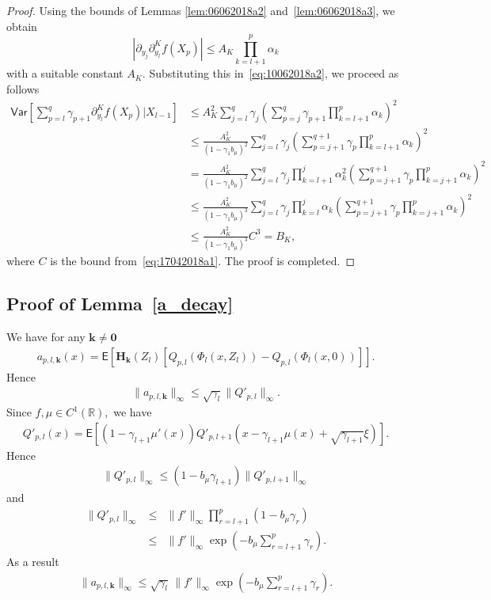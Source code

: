\documentclass[article]{elsarticle}
\begin{document}
\begin{proof}
Using the bounds of
Lemmas \ref{lem:06062018a2} and~\ref{lem:06062018a3},
we obtain
\[
\left|\partial_{y_{j}}\partial_{y_{l}}^{K}f\left(X_{p}\right)\right|
\leq A_{K}\prod_{k=l+1}^{p}\alpha_{k}
\]
with a suitable constant $A_{K}$.
Substituting this in~\eqref{eq:10062018a2},
we proceed as follows
\begin{align*}
\mathsf{Var}\left[\sum_{p=l}^{q}\gamma_{p+1}\partial_{y_{l}}^{K}f\left(X_{p}\right)\Big|X_{l-1}\right]
&\le
A_{K}^{2}\sum_{j=l}^{q}\gamma_{j}
\left(\sum_{p=j}^{q}\gamma_{p+1}\prod_{k=l+1}^{p}\alpha_{k}\right)^{2}
\\
&\le
\frac{A_{K}^{2}}{(1-\gamma_1 b_\mu)^2}
\sum_{j=l}^{q} \gamma_{j}
\left(
\sum_{p=j+1}^{q+1} \gamma_{p} \prod_{k=l+1}^{p} \alpha_{k}
\right)^{2}
\\
&=
\frac{A_{K}^{2}}{(1-\gamma_1 b_\mu)^2}
\sum_{j=l}^{q} \gamma_{j}
\prod_{k=l+1}^{j} \alpha_{k}^2
\left(
\sum_{p=j+1}^{q+1} \gamma_{p} \prod_{k=j+1}^{p} \alpha_{k}
\right)^{2}
\\
&\le
\frac{A_{K}^{2}}{(1-\gamma_1 b_\mu)^3}
\sum_{j=l}^{q} \gamma_{j}
\prod_{k=l}^{j} \alpha_{k}
\left(
\sum_{p=j+1}^{q+1} \gamma_{p} \prod_{k=j+1}^{p} \alpha_{k}
\right)^{2}
\\
&\le
\frac{A_{K}^{2}}{(1-\gamma_1 b_\mu)^3}C^3=B_K,
\end{align*}
where $C$ is the bound from~\eqref{eq:17042018a1}.
The proof is completed.
\end{proof}

\subsection{Proof of Lemma~\ref{a_decay}}

We have for any \(\mathbf{k}\neq \mathbf{0}\)
\begin{eqnarray*}
a_{p,l,\mathbf{k}}(x)=\mathsf{E}\left[\mathbf{H}_\mathbf{k}\left(Z_l\right)[Q_{p,l}\left(\Phi_l(x,Z_l)\right)-Q_{p,l}\left(\Phi_l(x,0)\right)]\right].
\end{eqnarray*}
Hence
\begin{eqnarray*}
\|a_{p,l,\mathbf{k}}\|_{\infty}\leq \sqrt{\gamma_l}\|Q'_{p,l}\|_{\infty}.
\end{eqnarray*}
Since \(f,\mu\in C^1(\mathbb{R}),\)  we have
\begin{eqnarray*}
Q'_{p,l}(x)=\mathsf{E}\left[(1-\gamma_{l+1}\mu'(x))Q'_{p,l+1}(x-\gamma_{l+1}\mu(x)+\sqrt{\gamma_{l+1}}\xi)\right].
\end{eqnarray*}
Hence
\begin{eqnarray*}
\|Q'_{p,l}\|_\infty\leq (1-b_{\mu}\gamma_{l+1})\|Q'_{p,l+1}\|_\infty
\end{eqnarray*}
and
\begin{eqnarray*}
\|Q'_{p,l}\|_\infty&\leq & \|f'\|_\infty\prod_{r=l+1}^p (1-b_{\mu}\gamma_{r})
\\
&\leq & \|f'\|_\infty\exp\left(-b_{\mu}\sum_{r=l+1}^p \gamma_{r}  \right).
\end{eqnarray*}
As a result
\begin{eqnarray*}
\|a_{p,l,\mathbf{k}}\|_{\infty}\leq \sqrt{\gamma_l}\, \|f'\|_\infty\exp\left(-b_{\mu}\sum_{r=l+1}^p \gamma_{r}  \right).
\end{eqnarray*}





\end{document}

